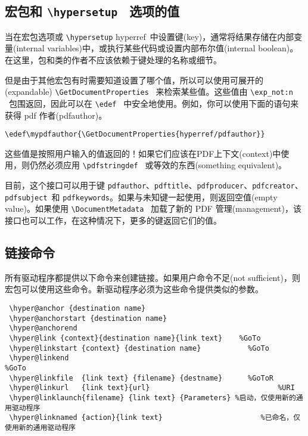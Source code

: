 \documentclass{article}
\newcommand*{\cs}[1]{%
  \texttt{\textbackslash #1}%
}
\newcommand*{\xpackage}[1]{\textsf{#1}}
\begin{document}
\subsection[宏包和 \cs{hypersetup}\ 选项的值]{{\heiti 宏包和} \cs{hypersetup}\ {\heiti 选项的值}}
\marginpar{\footnotesize \heiti \color{red}{7.00s版本新增}}当在宏包选项或 \cs{hypersetup} \xpackage{hyperref}\ 中设置键(key)，通常将结果存储在内部变量(internal variables)中，或执行某些代码或设置内部布尔值(internal boolean)。在这里，包和类的作者{\kaiti 不应该}依赖于键处理的名称或细节。

但是由于其他宏包有时需要知道设置了哪个值，所以可以使用可展开的(expandable) \cs{GetDocumentProperties}\ 来检索某些值。这些值由 \cs{exp\_not:n}\ 包围返回，因此可以在 \cs{edef}\ 中安全地使用。例如，你可以使用下面的语句来获得 pdf 作者(pdfauthor)。

\begin{verbatim}
\edef\mypdfauthor{\GetDocumentProperties{hyperref/pdfauthor}}
\end{verbatim}

这些值是按照用户输入的值返回的！如果它们应该在PDF上下文(context)中使用，则仍然必须应用 \cs{pdfstringdef}\ 或等效的东西(something equivalent)。

目前，这个接口可以用于键 \texttt{pdfauthor}、\texttt{pdftitle}、\texttt{pdfproducer}、\texttt{pdfcreator}、\texttt{pdfsubject}\ 和 \texttt{pdfkeywords}。如果与未知键一起使用，则返回空值(empty value)。如果使用 \cs{DocumentMetadata}\ 加载了新的 PDF 管理(management)，该接口也可以工作，在这种情况下，更多的键返回它们的值。


\subsection[链接命令]{\heiti 链接命令}
所有驱动程序都提供以下命令来创建链接。如果用户命令不足(not sufficient)，则宏包可以使用这些命令。新驱动程序必须为这些命令提供类似的参数。

\begin{verbatim}
 \hyper@anchor {destination name}
 \hyper@anchorstart {destination name}
 \hyper@anchorend
 \hyper@link {context}{destination name}{link text}    %GoTo
 \hyper@linkstart {context} {destination name}           %GoTo
 \hyper@linkend                                                     %GoTo
 \hyper@linkfile  {link text} {filename} {destname}      %GoToR
 \hyper@linkurl   {link text}{url}                              %URI
 \hyper@linklaunch{filename} {link text} {Parameters} %启动，仅使用新的通用驱动程序
 \hyper@linknamed {action}{link text}                       %已命名，仅使用新的通用驱动程序
\end{verbatim}
\end{document}
